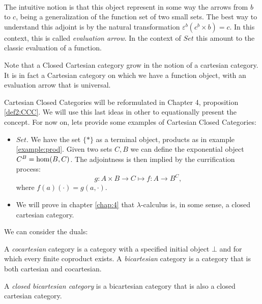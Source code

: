 \begin{definition}
\begin{itemize}
\



  The intuitive notion is that this object represent in some way the arrows from $b$ to $c$, being a generalization of the function set of two small sets. The best way to understand this adjoint is by the natural transformation $\varepsilon^b(c^b\times b) = c$. In this context, this is called \emph{evaluation arrow}. In the context of $Set$ this amount to the classic evaluation of a function.\\

\end{itemize}
\begin{remark}
Note that a Closed Cartesian category grow in the notion of a cartesian category. It is in fact a Cartesian category on which we have a function object, with an evaluation arrow that is universal.
\end{remark}

Cartesian Closed Categories will be reformulated in Chapter 4, proposition \ref{def2:CCC}. We will use this last ideas in other to equationally present the concept. For now on, lets provide some examples of Cartesian Closed Categories:


 

\begin{example}
  \begin{itemize}
  \item $Set$. We have the set $\{*\}$ as a terminal object, products as in example \ref{example:prod}. Given two sets $C, B$ we can define the exponential object $C^B= \operatorname{hom} (B,C)$. The adjointness is then implied by the currification process:
    $$g: A\times B \to C \mapsto f: A \to B^C,$$
    where $f(a)(\cdot) = g(a,\cdot)$.
  \item We will prove in chapter \ref{chap:4} that $\lambda$-calculus is, in some sense, a closed cartesian category.
  \end{itemize}
\end{example}


We can consider the duals:

\begin{definition}
  A \emph{cocartesian} category is a category with a specified initial object $\bot$ and for which every finite coproduct exists. A \emph{bicartesian} category is a category that is both cartesian and cocartesian.
\end{definition}

\begin{definition}A \emph{closed bicartesian category} is a bicartesian category that is also a closed cartesian category.
\end{definition}


\end{definition}
